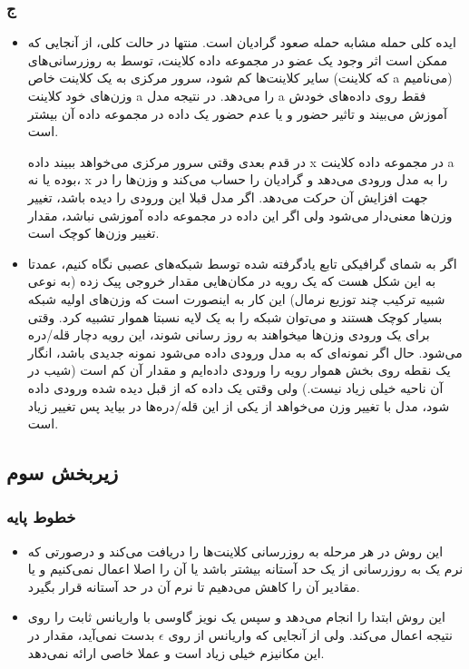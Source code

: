 \subsubsection{ج}
\begin{itemize}
	\item 
	ایده کلی حمله مشابه حمله صعود گرادیان است. منتها در حالت کلی، از آنجایی که ممکن است اثر وجود یک عضو در مجموعه داده کلاینت، توسط به روزرسانی‌های سایر کلاینت‌ها کم شود، سرور مرکزی به یک کلاینت خاص (که کلاینت a می‌نامیم) وزن‌های خود کلاینت a را می‌دهد. در  نتیجه مدل a فقط روی داده‌های خودش آموزش می‌بیند و تاثیر حضور و یا عدم حضور یک داده در مجموعه داده آن بیشتر است. 
	
	در قدم بعدی وقتی سرور مرکزی می‌خواهد ببیند داده x در مجموعه داده کلاینت a بوده یا نه، x را به مدل ورودی می‌دهد و گرادیان را حساب می‌کند و وزن‌ها را در جهت افزایش آن حرکت می‌دهد. اگر مدل قبلا این ورودی را دیده باشد، تغییر وزن‌ها معنی‌دار می‌شود ولی اگر این داده در مجموعه داده آموزشی نباشد، مقدار تغییر وزن‌ها کوچک است.
	\item 
	اگر به شمای گرافیکی تابع یادگرفته شده توسط شبکه‌های عصبی نگاه کنیم، عمدتا به این شکل هست که یک رویه در مکان‌هایی مقدار خروجی پیک زده (به نوعی شبیه ترکیب چند توزیع نرمال) این کار به اینصورت است که وزن‌های اولیه شبکه بسیار کوچک هستند و می‌توان شبکه را به یک لایه نسبتا هموار تشبیه کرد. وقتی برای یک ورودی وزن‌ها میخواهند به روز رسانی شوند، این رویه دچار قله/دره می‌شود. حال اگر نمونه‌ای که به مدل ورودی داده می‌شود نمونه جدیدی باشد، انگار یک نقطه روی بخش هموار رویه را ورودی داده‌ایم و مقدار آن کم است (شیب در آن ناحیه خیلی زیاد نیست.) ولی وقتی یک داده که از قبل دیده شده ورودی داده شود، مدل با تغییر وزن می‌خواهد از یکی از این قله/دره‌ها در بیاید پس تغییر زیاد است.
	 
\end{itemize}
\subsection{زیربخش سوم}
\subsubsection{خطوط پایه}
\begin{itemize}
	\item 
	\textbf{}
	این روش در هر مرحله به روزرسانی کلاینت‌ها را دریافت می‌کند و درصورتی که نرم یک به روزرسانی از یک حد آستانه بیشتر باشد یا آن را اصلا اعمال نمی‌کنیم و یا مقادیر آن را کاهش می‌دهیم تا نرم آن در حد آستانه قرار بگیرد. 
	\item \textbf{}
	این روش ابتدا 
	را انجام می‌دهد و سپس یک نویز گاوسی با واریانس ثابت را روی نتیجه اعمال می‌کند. ولی از آنجایی که واریانس از روی 
	$\epsilon$
	بدست نمی‌آید، مقدار 
	در این مکانیزم خیلی زیاد است و عملا 
	خاصی ارائه نمی‌دهد. 
\end{itemize}
